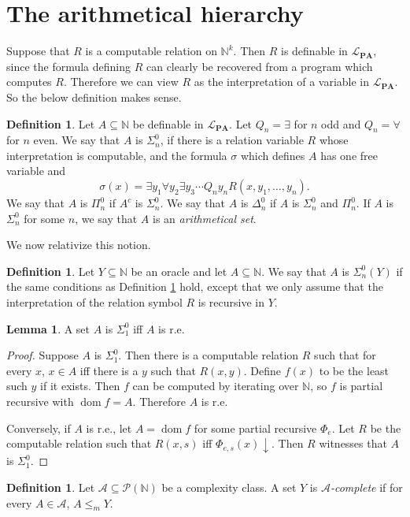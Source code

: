 \documentclass[12pt]{report}
\newcommand{\NN}{\mathbb{N}}
\newcommand{\pset}{\mathcal{P}}
\newcommand{\halts}{\downarrow}
\newcommand{\PA}{\mathbf{PA}}
\DeclareMathOperator{\dom}{dom}
\newcommand{\dfn}[1]{\emph{#1}\index{#1}}
\theoremstyle{definition}
\newtheorem{lemma}[theorem]{Lemma}
\newtheorem{definition}[theorem]{Definition}
\begin{document}
\section{The arithmetical hierarchy}
Suppose that $R$ is a computable relation on $\NN^k$. Then $R$ is definable in $\mathcal L_{\PA}$, since the formula defining $R$ can clearly be recovered from a program which computes $R$. Therefore we can view $R$ as the interpretation of a variable in $\mathcal L_{\PA}$. So the below definition makes sense.
\begin{definition}
\label{arithemtical hierarchy}
Let $A \subseteq \NN$ be definable in $\mathcal L_{\PA}$. Let $Q_n = \exists$ for $n$ odd and $Q_n = \forall$ for $n$ even. We say that $A$ is $\Sigma_n^0$, if there is a relation variable $R$ whose interpretation is computable, and the formula $\sigma$ which defines $A$ has one free variable and
$$\sigma(x) = \exists y_1 \forall y_2 \exists y_3 \cdots Q_n y_n R(x, y_1, \dots, y_n).$$
We say that $A$ is $\Pi_n^0$ if $A^c$ is $\Sigma_n^0$. We say that $A$ is $\Delta_n^0$ if $A$ is $\Sigma_n^0$ and $\Pi_n^0$. If $A$ is $\Sigma_n^0$ for some $n$, we say that $A$ is an \dfn{arithmetical set}.
\end{definition}
We now relativize this notion.
\begin{definition}
Let $Y \subseteq \NN$ be an oracle and let $A \subseteq \NN$. We say that $A$ is $\Sigma_n^0(Y)$ if the same conditions as Definition \ref{arithemtical hierarchy} hold, except that we only assume that the interpretation of the relation symbol $R$ is recursive in $Y$.
\end{definition}

\begin{lemma}
  \label{sigma 10 re}
A set $A$ is $\Sigma_1^0$ iff $A$ is r.e.
\end{lemma}
\begin{proof}
Suppose $A$ is $\Sigma_1^0$. Then there is a computable relation $R$ such that for every $x$, $x \in A$ iff there is a $y$ such that $R(x, y)$. Define $f(x)$ to be the least such $y$ if it exists. Then $f$ can be computed by iterating over $\NN$, so $f$ is partial recursive with $\dom f = A$. Therefore $A$ is r.e.

Conversely, if $A$ is r.e., let $A = \dom f$ for some partial recursive $\Phi_e$. Let $R$ be the computable relation such that $R(x, s)$ iff $\Phi_{e,s}(x) \halts$. Then $R$ witnesses that $A$ is $\Sigma_1^0$.
\end{proof}

\begin{definition}
Let $\mathcal A \subseteq \pset(\NN)$ be a complexity class. A set $Y$ is \dfn{$\mathcal A$-complete} if for every $A \in \mathcal A$, $A \leq_m Y$.
\end{definition}
\end{document}
